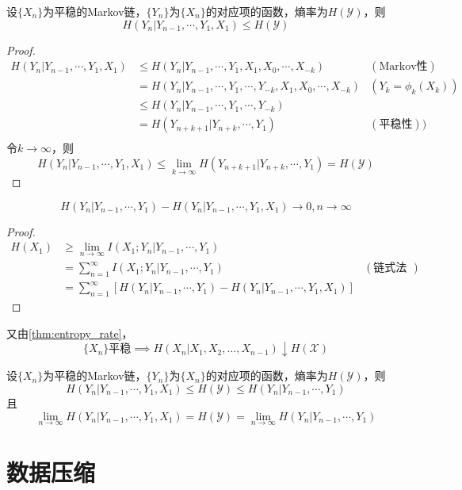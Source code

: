 \documentclass{ctexbook}
\begin{document}
\begin{lemma}
    设$\{X_n\}$为平稳的Markov链，$\{Y_n\}$为$\{X_n\}$的对应项的函数，熵率为$H(\mathcal{Y} )$，则
    $$H(Y_n|Y_{n-1},\cdots,Y_1,X_1) \leq H(\mathcal{Y} )$$
\end{lemma}
\begin{proof}
    \begin{align*}
        H(Y_n|Y_{n-1},\cdots,Y_1,X_1) &\leq H(Y_n|Y_{n-1},\cdots,Y_1,X_1,X_0,\cdots,X_{-k}) &(\text{Markov性})\\
        &=H(Y_n|Y_{n-1},\cdots,Y_1,\cdots,Y_{-k},X_1,X_0,\cdots,X_{-k}) &(Y_k=\phi_k(X_k))\\
        &\leq H(Y_n|Y_{n-1},\cdots,Y_1,\cdots,Y_{-k})\\
        &=H(Y_{n+k+1}|Y_{n+k},\cdots,Y_{1})&(\text{平稳性}))\\
    \end{align*}
    令$k\to \infty$，则
    \[H(Y_n|Y_{n-1},\cdots,Y_1,X_1) \leq \lim_{k\to \infty} H(Y_{n+k+1}|Y_{n+k},\cdots,Y_{1}) = H(\mathcal{Y} )\]
\end{proof}

\begin{lemma}
    \[H(Y_n|Y_{n-1},\cdots,Y_1)-H(Y_n|Y_{n-1},\cdots,Y_1,X_1)\to 0,n\to\infty\]
\end{lemma}
\begin{proof}
\begin{align*}
    H(X_1)&\geq\lim_{n\to \infty} I(X_1;Y_n|Y_{n-1},\cdots,Y_1) \\
    &=\sum_{n=1}^{\infty}I(X_1;Y_n|Y_{n-1},\cdots,Y_1)&(\text{链式法则})\\
    &= \sum_{n=1}^{\infty} [H(Y_n|Y_{n-1},\cdots,Y_1)-H(Y_n|Y_{n-1},\cdots,Y_1,X_1)] 
\end{align*}
\end{proof}
又由\ref{thm:entropy_rate}，
\[\{X_n\}\text{平稳}\implies H(X_n|X_{1},X_{2},\ldots,X_{n-1})\downarrow H(\mathcal{X} )\]
\begin{theorem}
    设$\{X_n\}$为平稳的Markov链，$\{Y_n\}$为$\{X_n\}$的对应项的函数，熵率为$H(\mathcal{Y} )$，则
    \[H(Y_n|Y_{n-1},\cdots,Y_1,X_1)\leq H(\mathcal{Y} )\leq H(Y_n|Y_{n-1},\cdots,Y_1)\]
    且
    \[\lim_{n\to \infty} H(Y_n|Y_{n-1},\cdots,Y_1,X_1)=H(\mathcal{Y} ) = \lim_{n\to \infty} H(Y_n|Y_{n-1},\cdots,Y_1)\]
\end{theorem}

\chapter{数据压缩}
\end{document}
